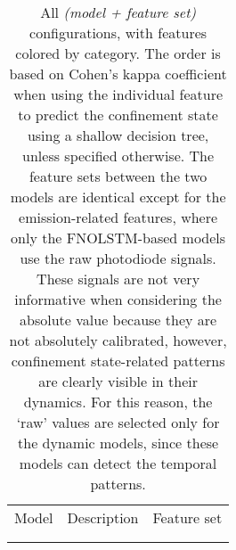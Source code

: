 \setlength\tabcolsep{5.3pt}
\begingroup
\centering
\begin{longtable}{l|p{2.7cm}|p{10.9cm}}
Model & Description & Feature set \\\cmidrule[\heavyrulewidth]{1-3}
\addlinespace[-\belowrulesep]

\\
\caption{All \textit{(model + feature set)} configurations, with features colored by category. The order is based on Cohen's kappa coefficient when using the individual feature to predict the confinement state using a shallow decision tree, unless specified otherwise. The feature sets between the two models are identical except for the emission-related features, where only the FNOLSTM-based models use the raw photodiode signals. These signals are not very informative when considering the absolute value because they are not absolutely calibrated, however, confinement state-related patterns are clearly visible in their dynamics. For this reason, the `raw' values are selected only for the dynamic models, since these models can detect the temporal patterns.}\label{tab:model_featuresets}
\end{longtable}
\endgroup
\setlength\tabcolsep{6pt}
